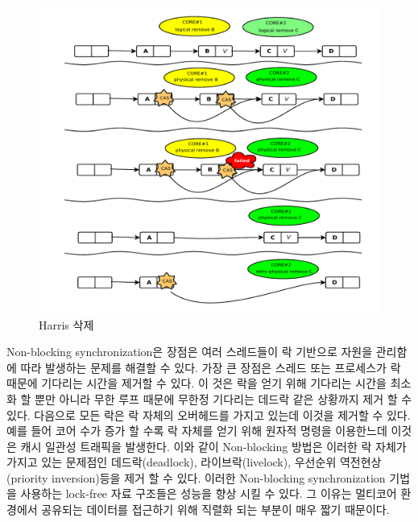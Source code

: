 \begin{figure}[h!]
    \centering
    \includegraphics[width=1\textwidth]{fig/harris/harris}
    \caption{Harris 삭제}
  \label{fig:harris}
\end{figure}


Non-blocking synchronization은 장점은 여러 스레드들이 락 기반으로 자원을 관리함에 따라
 발생하는 문제를 해결할 수 있다. 
가장 큰 장점은 스레드 또는 프로세스가 락 때문에 기다리는 시간을 제거할 수 있다.
이 것은 락을 얻기 위해 기다리는 시간을 최소화 할 뿐만 아니라 무한 루프 때문에 무한정 기다리는 
데드락 같은 상황까지 제거 할 수 있다. 
다음으로 모든 락은 락 자체의 오버헤드를 가지고 있는데 이것을 제거할 수 있다. 
예를 들어 코어 수가 증가 할 수록 락 자체를 얻기 위해 원자적 명령을 이용한느데 이것은 캐시 일관성 트래픽을 
발생한다. 
이와 같이 Non-blocking 방법은 이러한 락 자체가 가지고 있는 문제점인 데드락(deadlock), 라이브락(livelock), 
우선순위 역전현상(priority inversion)등을 제거 할 수 있다. 
이러한 Non-blocking synchronization 기법을 사용하는 lock-free 자료 구조들은 성능을 향상 시킬 수 있다. 
그 이유는 멀티코어 환경에서 공유되는 데이터를 접근하기 위해 직렬화 되는 부분이 매우 짧기 때문이다. 




